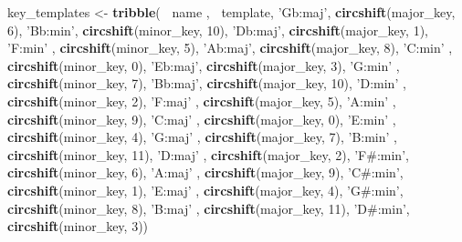 \documentclass[]{article}
\newenvironment{Shaded}{\begin{snugshade}}{\end{snugshade}}
\newcommand{\DecValTok}[1]{\textcolor[rgb]{0.00,0.00,0.81}{#1}}
\newcommand{\KeywordTok}[1]{\textcolor[rgb]{0.13,0.29,0.53}{\textbf{#1}}}
\newcommand{\NormalTok}[1]{#1}
\newcommand{\OperatorTok}[1]{\textcolor[rgb]{0.81,0.36,0.00}{\textbf{#1}}}
\newcommand{\StringTok}[1]{\textcolor[rgb]{0.31,0.60,0.02}{#1}}
\begin{document}
\begin{Shaded}
\begin{Highlighting}[]
\NormalTok{key_templates <-}
\StringTok{    }\KeywordTok{tribble}\NormalTok{(}
        \OperatorTok{~}\NormalTok{name    , }\OperatorTok{~}\NormalTok{template,}
        \StringTok{'Gb:maj'}\NormalTok{, }\KeywordTok{circshift}\NormalTok{(major_key,  }\DecValTok{6}\NormalTok{),}
        \StringTok{'Bb:min'}\NormalTok{, }\KeywordTok{circshift}\NormalTok{(minor_key, }\DecValTok{10}\NormalTok{),}
        \StringTok{'Db:maj'}\NormalTok{, }\KeywordTok{circshift}\NormalTok{(major_key,  }\DecValTok{1}\NormalTok{),}
        \StringTok{'F:min'}\NormalTok{ , }\KeywordTok{circshift}\NormalTok{(minor_key,  }\DecValTok{5}\NormalTok{),}
        \StringTok{'Ab:maj'}\NormalTok{, }\KeywordTok{circshift}\NormalTok{(major_key,  }\DecValTok{8}\NormalTok{),}
        \StringTok{'C:min'}\NormalTok{ , }\KeywordTok{circshift}\NormalTok{(minor_key,  }\DecValTok{0}\NormalTok{),}
        \StringTok{'Eb:maj'}\NormalTok{, }\KeywordTok{circshift}\NormalTok{(major_key,  }\DecValTok{3}\NormalTok{),}
        \StringTok{'G:min'}\NormalTok{ , }\KeywordTok{circshift}\NormalTok{(minor_key,  }\DecValTok{7}\NormalTok{),}
        \StringTok{'Bb:maj'}\NormalTok{, }\KeywordTok{circshift}\NormalTok{(major_key, }\DecValTok{10}\NormalTok{),}
        \StringTok{'D:min'}\NormalTok{ , }\KeywordTok{circshift}\NormalTok{(minor_key,  }\DecValTok{2}\NormalTok{),}
        \StringTok{'F:maj'}\NormalTok{ , }\KeywordTok{circshift}\NormalTok{(major_key,  }\DecValTok{5}\NormalTok{),}
        \StringTok{'A:min'}\NormalTok{ , }\KeywordTok{circshift}\NormalTok{(minor_key,  }\DecValTok{9}\NormalTok{),}
        \StringTok{'C:maj'}\NormalTok{ , }\KeywordTok{circshift}\NormalTok{(major_key,  }\DecValTok{0}\NormalTok{),}
        \StringTok{'E:min'}\NormalTok{ , }\KeywordTok{circshift}\NormalTok{(minor_key,  }\DecValTok{4}\NormalTok{),}
        \StringTok{'G:maj'}\NormalTok{ , }\KeywordTok{circshift}\NormalTok{(major_key,  }\DecValTok{7}\NormalTok{),}
        \StringTok{'B:min'}\NormalTok{ , }\KeywordTok{circshift}\NormalTok{(minor_key, }\DecValTok{11}\NormalTok{),}
        \StringTok{'D:maj'}\NormalTok{ , }\KeywordTok{circshift}\NormalTok{(major_key,  }\DecValTok{2}\NormalTok{),}
        \StringTok{'F#:min'}\NormalTok{, }\KeywordTok{circshift}\NormalTok{(minor_key,  }\DecValTok{6}\NormalTok{),}
        \StringTok{'A:maj'}\NormalTok{ , }\KeywordTok{circshift}\NormalTok{(major_key,  }\DecValTok{9}\NormalTok{),}
        \StringTok{'C#:min'}\NormalTok{, }\KeywordTok{circshift}\NormalTok{(minor_key,  }\DecValTok{1}\NormalTok{),}
        \StringTok{'E:maj'}\NormalTok{ , }\KeywordTok{circshift}\NormalTok{(major_key,  }\DecValTok{4}\NormalTok{),}
        \StringTok{'G#:min'}\NormalTok{, }\KeywordTok{circshift}\NormalTok{(minor_key,  }\DecValTok{8}\NormalTok{),}
        \StringTok{'B:maj'}\NormalTok{ , }\KeywordTok{circshift}\NormalTok{(major_key, }\DecValTok{11}\NormalTok{),}
        \StringTok{'D#:min'}\NormalTok{, }\KeywordTok{circshift}\NormalTok{(minor_key,  }\DecValTok{3}\NormalTok{))}
\end{Highlighting}
\end{Shaded}
\end{document}
